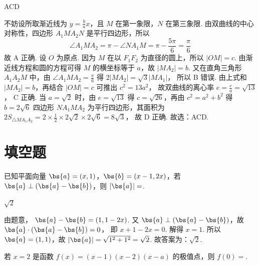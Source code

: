 \begin{answer}
ACD
\end{answer}

\begin{solution}
不妨设所取渐近线为 \(y=\frac{b}{a}x\)，且 \(M\) 在第一象限，\(N\) 在第三象限.
由双曲线的中心对称性，四边形 \(A_1MA_2N\) 是平行四边形，所以
\[
\angle A_1MA_2=\pi-\angle NA_1M=\pi-\frac{5\pi}{6}=\frac{\pi}{6}
\]
故 A 正确.
设 \(O\) 为原点. 因为 \(M\) 在以 \(F_1F_2\) 为直径的圆上，所以 \(|OM|=c\). 由渐近线方程和圆的方程可得 \(M\) 的横坐标等于 \(a\)，故 \(|MA_2|=b\). 又在直角三角形 \(A_1A_2M\) 中，由 \(\angle A_1MA_2=\frac{\pi}{6}\) 得
\(2|MA_2|=\sqrt3|MA_1|\)，
所以 B 错误.
由上式和 \(|MA_2|=b\)，再结合 \(|OM|=c\) 可推出
\(c^2=13a^2\)，
故双曲线的离心率
\(e=\frac{c}{a}=\sqrt{13}\)，
C 正确.
当 \(a=\sqrt2\) 时，由 \(e=\sqrt{13}\) 得 \(c=\sqrt{26}\)，再由 \(c^2=a^2+b^2\) 得
\(
b=2\sqrt6
\)
四边形 \(NA_1MA_2\) 为平行四边形，其面积为
\(
2S_{\triangle MA_1A_2}=2\times \frac12 \times 2\sqrt2 \times 2\sqrt6=8\sqrt3
\)，
故 D 正确. 故选：ACD.
\end{solution}
\section{填空题}

\begin{problem}
已知平面向量 \(\bs{a}=(x,1)\)，\(\bs{b}=(x-1,2x)\)，若 \(\bs{a}\perp(\bs{a}-\bs{b})\)，则 \(|\bs{a}|=\)\fillinblank{}.
\end{problem}

\begin{answer}
\(\sqrt2\)
\end{answer}

\begin{solution}
由题意，
\(\bs{a}-\bs{b}=(1,1-2x)\).
又 \(\bs{a}\perp(\bs{a}-\bs{b})\)，故
\(\bs{a}\cdot(\bs{a}-\bs{b})=0\)，
即
\(x+1-2x=0\).
解得 \(x=1\). 所以 \(\bs{a}=(1,1)\)，故
\(|\bs{a}|=\sqrt{1^2+1^2}=\sqrt2\).
故答案为：\(\sqrt2\).
\end{solution}

\begin{problem}
若 \(x=2\) 是函数 \(f(x)=(x-1)(x-2)(x-a)\) 的极值点，则 \(f(0)=\)\fillinblank{}.
\end{problem}

